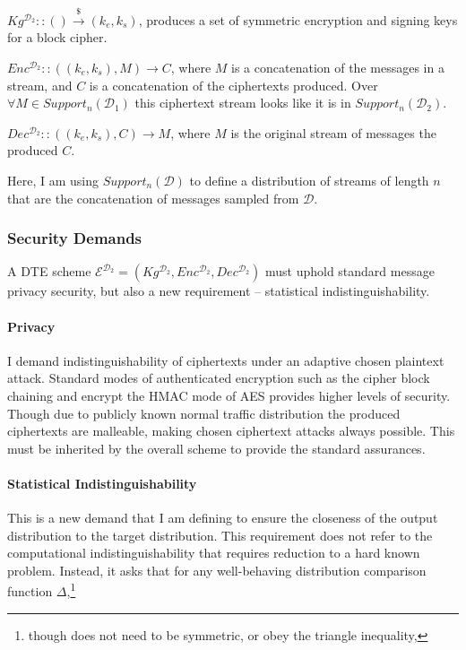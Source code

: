 \documentclass[ %
                    author={Samuel Russell},
                supervisor={Prof. Bogdan Warinschi},
                    degree={MEng},
                     title={Innocuous Ciphertexts},
                  subtitle={The DE-CENSOR Scheme},
                      type={Research},
                      year={2018} ]{dissertation}
\begin{document}
$Kg^{\mathcal{D}_2} :: () \xrightarrow{\$} (k_e,k_s)$, produces a set of symmetric encryption and signing keys for a block cipher.

$Enc^{\mathcal{D}_2} :: ((k_e,k_s), M) \rightarrow C$, where $M$ is a concatenation of the messages in a stream, and $C$ is a concatenation of the ciphertexts produced. Over $\forall M \in Support_n(\mathcal{D}_1)$ this ciphertext stream looks like it is in  $Support_n(\mathcal{D}_2)$.

$Dec^{\mathcal{D}_2} :: ((k_e,k_s), C) \rightarrow M$, where $M$ is the original stream of messages the produced $C$.

Here, I am using $Support_n(\mathcal{D})$ to define a distribution of streams of length $n$ that are the concatenation of messages sampled from $\mathcal{D}$.

\subsubsection{Security Demands}

A DTE scheme $\mathcal{E}^{\mathcal{D}_2} = (Kg^{\mathcal{D}_2}, Enc^{\mathcal{D}_2}, Dec^{\mathcal{D}_2})$ must uphold standard message privacy security, but also a new requirement -- statistical indistinguishability.

\paragraph{Privacy}

I demand indistinguishability of ciphertexts under an adaptive chosen plaintext attack. Standard modes of authenticated encryption such as the cipher block chaining and encrypt the HMAC mode of AES provides higher levels of security.
Though due to publicly known normal traffic distribution the produced ciphertexts are malleable, making chosen ciphertext attacks always possible.
This must be inherited by the overall scheme to provide the standard assurances.

\paragraph{Statistical Indistinguishability}

This is a new demand that I am defining to ensure the closeness of the output distribution to the target distribution.
This requirement does not refer to the computational indistinguishability that requires reduction to a hard known problem.
Instead, it asks that for any well-behaving distribution comparison function $\Delta$,\footnote{though does not need to be symmetric, or obey the triangle inequality,}
\end{document}
